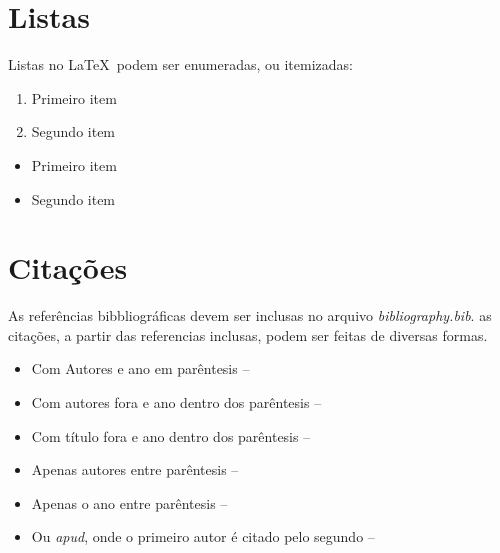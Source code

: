 
\section{Listas}
\label{sec:listas}

    Listas no \LaTeX\ podem ser enumeradas, ou itemizadas:


    \begin{enumerate}
        \item Primeiro item
        \item Segundo item
    \end{enumerate}


    \begin{itemize}
        \item Primeiro item
        \item Segundo item
    \end{itemize}


\section{Citações}

    As referências bibbliográficas devem ser inclusas no arquivo \textit{bibliography.bib}.
    as citações, a partir das referencias inclusas, podem ser feitas de diversas formas.


    \begin{itemize}
        \item Com Autores e ano em parêntesis -- \cite{wortmann2015internet}
        \item Com autores fora e ano dentro dos parêntesis -- \textcite{weber2010internet}
        \item Com título fora e ano dentro dos parêntesis -- 
        \item Apenas autores entre parêntesis -- \citeauthor{ashton2009internet}
        \item Apenas o ano entre parêntesis -- \citeyear{yoo2010research}
        \item Ou \textit{apud}, onde o primeiro autor é citado pelo segundo -- 
    \end{itemize}

